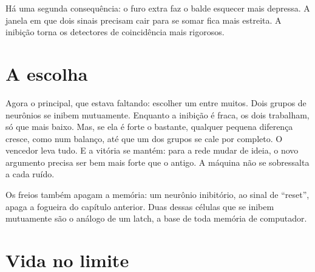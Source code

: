 
Há uma segunda consequência: o furo extra faz o balde esquecer mais depressa. A janela em que dois sinais precisam cair para se somar fica mais estreita. A inibição torna os detectores de coincidência mais rigorosos.

\section*{A escolha}

Agora o principal, que estava faltando: escolher um entre muitos. Dois grupos de neurônios se inibem mutuamente. Enquanto a inibição é fraca, os dois trabalham, só que mais baixo. Mas, se ela é forte o bastante, qualquer pequena diferença cresce, como num balanço, até que um dos grupos se cale por completo. O vencedor leva tudo. E a vitória se mantém: para a rede mudar de ideia, o novo argumento precisa ser bem mais forte que o antigo. A máquina não se sobressalta a cada ruído.

Os freios também apagam a memória: um neurônio inibitório, ao sinal de ``reset'', apaga a fogueira do capítulo anterior. Duas dessas células que se inibem mutuamente são o análogo de um latch, a base de toda memória de computador.

\section*{Vida no limite}

